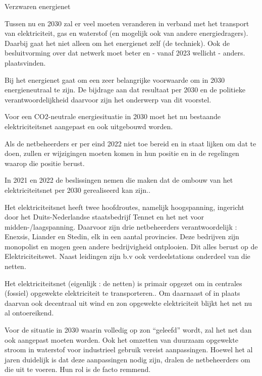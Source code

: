 \begin{voorstel}{Verzwaren energienet}

\begin{samenvatting}
Tussen nu en 2030 zal er veel moeten veranderen in verband met het transport van elektriciteit, gas en waterstof (en mogelijk ook van andere energiedragers). Daarbij gaat het niet alleen om het energienet zelf (de techniek). Ook de besluitvorming over dat netwerk moet beter en - vanaf 2023 wellicht - anders. plaatsvinden.

Bij het energienet gaat om een zeer belangrijke voorwaarde om in 2030 energieneutraal te zijn. De bijdrage aan dat resultaat per 2030 en de politieke verantwoordelijkheid daarvoor zijn het onderwerp van dit voorstel.

Voor een CO2-neutrale energiesituatie in 2030 moet het nu bestaande elektriciteitsnet aangepast en ook uitgebouwd worden.

Als de netbeheerders er per eind 2022 niet toe bereid en in staat lijken om dat te doen, zullen er wijzigingen moeten komen in hun positie en in de regelingen waarop die positie berust.
\end{samenvatting}

\begin{uitdaging}
In 2021 en 2022 de beslissingen nemen die maken dat de ombouw van het elektriciteitsnet per 2030 gerealiseerd kan zijn..
\end{uitdaging}

\begin{overwegingen}
Het elektriciteitsnet heeft twee hoofdroutes, namelijk hoogspanning, ingericht door het Duits-Nederlandse staatsbedrijf Tennet en het net voor midden-/laagspanning. Daarvoor zijn drie netbeheerders verantwoordelijk : Enexsis, Liander en Stedin, elk in een aantal provincies. Deze bedrijven zijn monopolist en mogen geen andere bedrijvigheid ontplooien. Dit alles berust op de Elektriciteitswet. Naast leidingen zijn b.v ook verdeelstations onderdeel van die netten.

Het elektriciteitsnet (eigenlijk : de netten) is primair opgezet om in centrales (fossiel) opgewekte elektriciteit te transporteren.. Om daarnaast of in plaats daarvan ook decentraal uit wind en zon opgewekte elektriciteit blijkt het net nu al ontoereikend.

Voor de situatie in 2030 waarin volledig op zon “geleefd” wordt, zal het net dan ook aangepast moeten worden. Ook het omzetten van duurzaam opgewekte stroom in waterstof voor industrieel gebruik vereist aanpassingen.
Hoewel het al jaren duidelijk is dat deze aanpassingen nodig zijn, dralen de netbeheerders om die uit te voeren. Hun rol is de facto remmend.


\end{overwegingen}
\end{voorstel}
